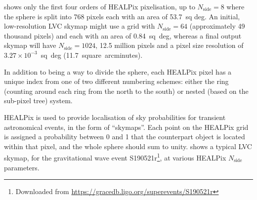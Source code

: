 \begin{colsection}
\begin{colsection}
 shows only the first four orders of HEALPix pixelisation, up to $N_\text{side} = 8$ where the sphere is split into 768 pixels each with an area of 53.7~sq deg. An initial, low-resolution LVC skymap might use a grid with $N_\text{side} = 64$ (approximately 49 thousand pixels) and each with an area of 0.84~sq~deg, whereas a final output skymap will have $N_\text{side} = 1024$, 12.5 million pixels and a pixel size resolution of $3.27 \times 10^{-3}$~sq~deg (11.7~square~arcminutes).

In addition to being a way to divide the sphere, each HEALPix pixel has a unique index from one of two different numbering schemes: either the ring (counting around each ring from the north to the south) or nested (based on the sub-pixel tree) system.

HEALPix is used to provide localisation of sky probabilities for transient astronomical events, in the form of ``skymaps''. Each point on the HEALPix grid is assigned a probability between 0 and 1 that the counterpart object is located within that pixel, and the whole sphere should sum to unity.  shows a typical LVC skymap, for the gravitational wave event S190521r\footnote{Downloaded from \url{https://gracedb.ligo.org/superevents/S190521r}}, at various HEALPix $N_\text{side}$ parameters.


\end{colsection}
\end{colsection}
